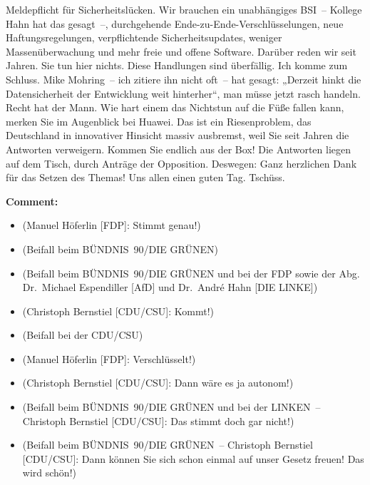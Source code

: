 \documentclass{article}
\begin{document}
Meldepflicht für Sicherheitslücken.  Wir brauchen ein unabhängiges BSI – Kollege Hahn hat das gesagt –, durchgehende Ende-zu-Ende-Verschlüsselungen, neue Haftungsregelungen, verpflichtende Sicherheitsupdates, weniger Massenüberwachung und mehr freie und offene Software.  Darüber reden wir seit Jahren. Sie tun hier nichts. Diese Handlungen sind überfällig.  Ich komme zum Schluss. Mike Mohring – ich zitiere ihn nicht oft – hat gesagt: „Derzeit hinkt die Datensicherheit der Entwicklung weit hinterher“, man müsse jetzt rasch handeln. Recht hat der Mann. Wie hart einem das Nichtstun auf die Füße fallen kann, merken Sie im Augenblick bei Huawei. Das ist ein Riesenproblem, das Deutschland in innovativer Hinsicht massiv ausbremst, weil Sie seit Jahren die Antworten verweigern. Kommen Sie endlich aus der Box! Die Antworten liegen auf dem Tisch, durch Anträge der Opposition. Deswegen: Ganz herzlichen Dank für das Setzen des Themas! Uns allen einen guten Tag. Tschüss.  

\noindent\textbf{Comment:}
\begin{itemize}
    \setlength\itemsep{-3pt}
    \item (Manuel Höferlin [FDP]: Stimmt genau!)
    \setlength\itemsep{-3pt}
    \item (Beifall beim BÜNDNIS 90/DIE GRÜNEN)
    \setlength\itemsep{-3pt}
    \item (Beifall beim BÜNDNIS 90/DIE GRÜNEN und bei der FDP sowie der Abg. Dr. Michael Espendiller [AfD] und Dr. André Hahn [DIE LINKE])
    \setlength\itemsep{-3pt}
    \item (Christoph Bernstiel [CDU/CSU]: Kommt!)
    \setlength\itemsep{-3pt}
    \item (Beifall bei der CDU/CSU)
    \setlength\itemsep{-3pt}
    \item (Manuel Höferlin [FDP]: Verschlüsselt!)
    \setlength\itemsep{-3pt}
    \item (Christoph Bernstiel [CDU/CSU]: Dann wäre es ja autonom!)
    \setlength\itemsep{-3pt}
    \item (Beifall beim BÜNDNIS 90/DIE GRÜNEN und bei der LINKEN – Christoph Bernstiel [CDU/CSU]: Das stimmt doch gar nicht!)
    \setlength\itemsep{-3pt}
    \item (Beifall beim BÜNDNIS 90/DIE GRÜNEN – Christoph Bernstiel [CDU/CSU]: Dann können Sie sich schon einmal auf unser Gesetz freuen! Das wird schön!)
\end{itemize}
\end{document}
